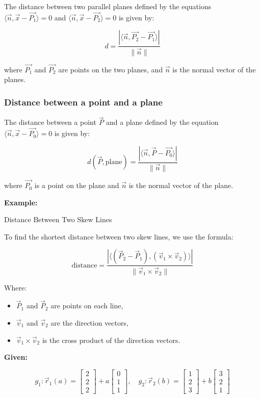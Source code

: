 The distance between two parallel planes defined by the equations \(\langle \vec{n}, \vec{x} - \vec{P_1} \rangle = 0\) and \(\langle \vec{n}, \vec{x} - \vec{P_2} \rangle = 0\) is given by:

\[
	d = \frac{|\langle \vec{n}, \vec{P_2} - \vec{P_1} \rangle|}{\|\vec{n}\|}
\]

where \(\vec{P_1}\) and \(\vec{P_2}\) are points on the two planes, and \(\vec{n}\) is the normal vector of the planes.

\subsubsection{Distance between a point and a plane}

The distance between a point \(\vec{P}\) and a plane defined by the equation \(\langle \vec{n}, \vec{x} - \vec{P_0} \rangle = 0\) is given by:

\[
	d(\vec{P}, \text{plane}) = \frac{|\langle \vec{n}, \vec{P} - \vec{P_0} \rangle|}{\|\vec{n}\|}
\]

where \(\vec{P_0}\) is a point on the plane and \(\vec{n}\) is the normal vector of the plane.

\textbf{Example:}

Distance Between Two Skew Lines

To find the shortest distance between two skew lines, we use the formula:

\[
	\text{distance} = \frac{|\langle(\vec{P}_2 - \vec{P}_1), (\vec{v}_1 \times \vec{v}_2)\rangle|}{\|\vec{v}_1 \times \vec{v}_2\|}
\]

Where:

\begin{itemize}

	\item \(\vec{P}_1\) and \(\vec{P}_2\) are points on each line,

	\item \(\vec{v}_1\) and \(\vec{v}_2\) are the direction vectors,

	\item \(\vec{v}_1 \times \vec{v}_2\) is the cross product of the direction vectors.

\end{itemize}

\textbf{Given:}

\[
	g_1: \vec{r}_1(a) = \begin{bmatrix} 2 \\ 2 \\ 2 \end{bmatrix} + a \begin{bmatrix} 0 \\ 1 \\ 1 \end{bmatrix}, \quad
	g_2: \vec{r}_2(b) = \begin{bmatrix} 1 \\ 2 \\ 3 \end{bmatrix} + b \begin{bmatrix} 3 \\ 2 \\ 1 \end{bmatrix}
\]

